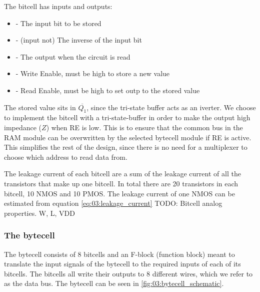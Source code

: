 The bitcell has inputs and outputs:
\begin{itemize}
    \item {} - The input bit to be stored
    \item {} - (input not) The inverse of the input bit
    \item {} - The output when the circuit is read
    \item {} - Write Enable, must be high to store a new value
    \item {} - Read Enable, must be high to set outp to the stored value
\end{itemize}

The stored value sits in $\overline{Q_1}$, since the tri-state buffer acts as an iverter. We choose to implement the bitcell with a tri-state-buffer in order to make the output high impedance ($Z$) when \textsc{RE} is low. This is to ensure that the common bus in the RAM module can be overwritten by the selected bytecell module if \textsc{RE} is active.
This simplifies the rest of the design, since there is no need for a multiplexer to choose which address to read data from. 

\hspace{}

The leakage current of each bitcell are a sum of the leakage current of all the transistors that make up one bitcell. In total there are 20 transistors in each bitcell, 10 \textsc{NMOS} and 10 \textsc{PMOS}. The leakage current of one \textsc{NMOS} can be estimated from equation \ref{eq:03:leakage_current}
TODO: Bitcell analog properties. W, L, VDD




\subsubsection{The bytecell}
The bytecell consists of 8 bitcells and an F-block (function block) meant to translate the input signals of the bytecell to the required inputs of each of its bitcells. The bitcells all write their outputs to 8 different wires, which we refer to as the data bus. The bytecell can be seen in \autoref{fig:03:bytecell_schematic}.

